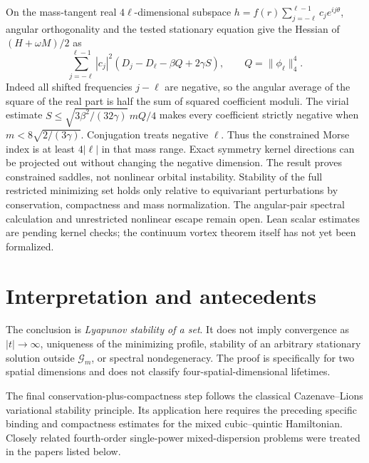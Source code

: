\documentclass[11pt]{article}
\newcommand{\GG}{\mathcal G}
\begin{document}
On the mass-tangent real \(4\ell\)-dimensional subspace
\(h=f(r)\sum_{j=-\ell}^{\ell-1}c_j e^{ij\theta}\), angular orthogonality
and the tested stationary equation give the Hessian of
\((H+\omega M)/2\) as
\[
\sum_{j=-\ell}^{\ell-1}|c_j|^2
       (D_j-D_\ell-\beta Q+2\gamma S),
\qquad Q=\|\phi_\ell\|_4^4 .
\]
Indeed all shifted frequencies \(j-\ell\) are negative, so the angular
average of the square of the real part is half the sum of squared
coefficient moduli. The virial estimate
\(S\le \sqrt{3\beta^2/(32\gamma)}\,mQ/4\)
makes every coefficient strictly negative when
\(m<8\sqrt{2/(3\gamma)}\). Conjugation treats negative \(\ell\).
Thus the constrained Morse index is at least \(4|\ell|\) in that
mass range. Exact symmetry kernel directions can be projected out
without changing the negative dimension. The result proves constrained
saddles, not nonlinear orbital instability. Stability of the full
restricted minimizing set holds only relative to equivariant
perturbations by conservation, compactness and mass normalization.
The angular-pair spectral calculation and unrestricted nonlinear
escape remain open. Lean scalar estimates are pending kernel checks;
the continuum vortex theorem itself has not yet been formalized.
\par

\section{Interpretation and antecedents}
The conclusion is \emph{Lyapunov stability of a set}. It does not imply
convergence as \(|t|\to\infty\), uniqueness of the minimizing profile,
stability of an arbitrary stationary solution outside \(\GG_m\), or
spectral nondegeneracy. The proof is specifically for two spatial
dimensions and does not classify four-spatial-dimensional lifetimes.

The final conservation-plus-compactness step follows the classical
Cazenave--Lions variational stability principle. Its application here
requires the preceding specific binding and compactness estimates for the
mixed cubic--quintic Hamiltonian. Closely related fourth-order single-power
mixed-dispersion problems were treated in the papers listed below.
\end{document}
